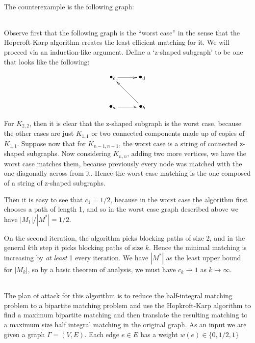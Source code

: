 \documentclass{article}
\newcommand{\problem}[1]{\noindent {\bf #1}}
\begin{document}
\problem{Problem 1.} \\
The counterexample is the following graph:

\problem{Problem 2.} \\
Observe first that the following graph is the ``worst case'' in the sense that the Hopcroft-Karp algorithm creates the least efficient matching for it. We will proceed via an induction-like argument. Define a `z-shaped subgraph' to be one that looks like the following:

\begin{displaymath}\xygraph{
!{<0cm,0cm>;<1cm,0cm>:<0cm,1cm>::}
!{(0,0) }*+{\bullet_{a}}="a"
!{(1.5,0) }*+{\bullet_{b}}="b"
!{(0,1.5) }*+{\bullet_{c}}="c"
!{(1.5,1.5)}*+{\bullet_{d}}="d"
"a":"b"
"b":"c"
"c":"d"
}
\end{displaymath}

For $K_{2,2}$, then it is clear that the z-shaped subgraph is the worst case, because the other cases are just $K_{1,1}$ or two connected components made up of copies of $K_{1,1}$. Suppose now that for $K_{n-1,n-1}$, the worst case is a string of connected z-shaped subgraphs. Now considering $K_{n,n}$, adding two more vertices, we have the worst case matches them, because previously every node was matched with the one diagonally across from it. Hence the worst case matching is the one composed of a string of z-shaped subgraphs.

Then it is easy to see that $c_1=1/2$, because in the worst case the algorithm first chooses a path of length 1, and so in the worst case graph described above we have $|M_1|/|M^{\ast}|=1/2$.

On the second iteration, the algorithm picks blocking paths of size 2, and in the general $k$th step it picks blocking paths of size $k$. Hence the minimal matching is increasing by \emph{at least} 1 every iteration. We have $|M^{\ast}|$ as the least upper bound for $|M_k|$, so by a basic theorem of analysis, we must have $c_k\to 1$ as $k\to\infty$.

\problem{Problem 3} \\
The plan of attack for this algorithm is to reduce the half-integral matching problem to a bipartite matching problem and use the Hopkroft-Karp algorithm to find a maximum bipartite matching and then translate the resulting matching to a maximum size half integral matching in the original graph. As an input we are given a graph $\Gamma = (V,E)$. Each edge $e \in E$ has a weight $w(e) \in \{0, 1/2, 1\}$
\end{document}
